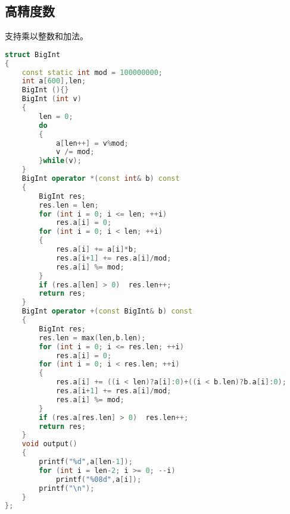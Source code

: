 \subsection{高精度数}
	支持乘以整数和加法。\\
	\begin{lstlisting}[language=c++]
struct BigInt
{
	const static int mod = 100000000;
	int a[600],len;
	BigInt (){}
	BigInt (int v)
	{
		len = 0;
		do
		{
			a[len++] = v%mod;
			v /= mod;
		}while(v);
	}
	BigInt operator *(const int& b) const
	{
		BigInt res;
		res.len = len;
		for (int i = 0; i <= len; ++i)
			res.a[i] = 0;
		for (int i = 0; i < len; ++i)
		{
			res.a[i] += a[i]*b;
			res.a[i+1] += res.a[i]/mod;
			res.a[i] %= mod;
		}
		if (res.a[len] > 0)  res.len++;
		return res;
	}
	BigInt operator +(const BigInt& b) const
	{
		BigInt res;
		res.len = max(len,b.len);
		for (int i = 0; i <= res.len; ++i)
			res.a[i] = 0;
		for (int i = 0; i < res.len; ++i)
		{
			res.a[i] += ((i < len)?a[i]:0)+((i < b.len)?b.a[i]:0);
			res.a[i+1] += res.a[i]/mod;
			res.a[i] %= mod;
		}
		if (res.a[res.len] > 0)  res.len++;
		return res;
	}
	void output()
	{
		printf("%d",a[len-1]);
		for (int i = len-2; i >= 0; --i)
			printf("%08d",a[i]);
		printf("\n");
	}
};
	\end{lstlisting} 